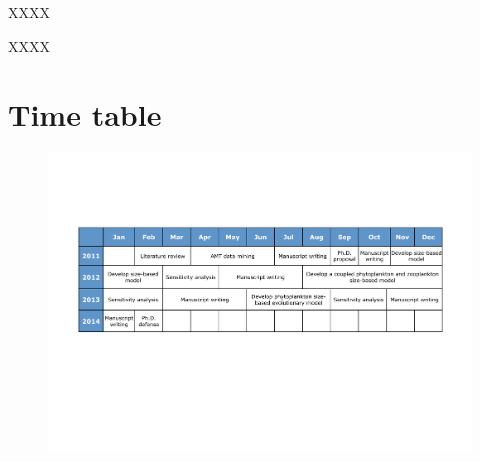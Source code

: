 XXXX

XXXX


\newpage

\section{Time table} 

\begin{figure}[h]
\centering
\includegraphics[trim = 20mm 25mm 20mm 25mm, clip, width=1\linewidth]{./Chp3-Further/Chronogram.pdf}
\end{figure}

